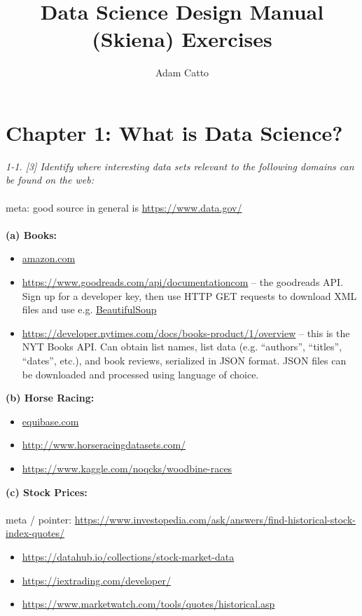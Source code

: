 \documentclass{article}[11pt]
\begin{document}
\title{Data Science Design Manual (Skiena) Exercises}
\author{Adam Catto}
\maketitle
\newpage
\section{Chapter 1: What is Data Science?}
\textit{1-1. [3] Identify where interesting data sets relevant to the following domains can be found on the web:}\\
 \\
 meta: good source in general is \url{https://www.data.gov/}\\
  \\
\textbf{(a) Books:} 
\begin{itemize}
	\item \url{amazon.com}
	\item \url{https://www.goodreads.com/api/documentationcom} – the goodreads API. Sign up for a developer key, then use HTTP GET requests to download XML files and use e.g. \href{https://www.crummy.com/software/BeautifulSoup/}{BeautifulSoup}
	\item \url{https://developer.nytimes.com/docs/books-product/1/overview} – this is the NYT Books API. Can obtain list names, list data (e.g. ``authors'', ``titles'', ``dates'', etc.), and book reviews, serialized in JSON format. JSON files can be downloaded and processed using language of choice.
 \end{itemize}
 \bigskip
\textbf{(b) Horse Racing:} 
\begin{itemize}
	\item \url{equibase.com}
	\item \url{http://www.horseracingdatasets.com/}
	\item \url{https://www.kaggle.com/noqcks/woodbine-races}
 \end{itemize}
 \bigskip
\textbf{(c) Stock Prices:} \\
\\
meta / pointer: \url{https://www.investopedia.com/ask/answers/find-historical-stock-index-quotes/}
\begin{itemize}
	\item \url{https://datahub.io/collections/stock-market-data}
	\item \url{https://iextrading.com/developer/}
	\item \url{https://www.marketwatch.com/tools/quotes/historical.asp}
\end{itemize}
\end{document}
